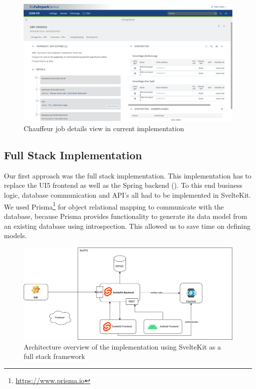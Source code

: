 \begin{figure}
    \centering
    \includegraphics[width=\linewidth]{assets/current-auftrag-details}
    \caption{Chauffeur job details view in current implementation}
    \label{fig:current-details-auftrag}
\end{figure}


\subsection{Full Stack Implementation}
Our first approach was the full stack implementation. This implementation has to replace the UI5 frontend as well as the Spring backend (). To this end business logic, database communication and API's all had to be implemented in SvelteKit. We used Prisma\footnote{\url{https://www.prisma.io}} for object relational mapping to communicate with the database, because Prisma provides functionality to generate its data model from an existing database using introspection. This allowed us to save time on defining models. 



\begin{figure}
    \centering
    \includegraphics[width=.8\linewidth]{assets/dswfd-architecture-fullstack}
    \caption{Architecture overview of the implementation using SvelteKit as a full stack framework}
    \label{fig:dswfd-architecture-fullstack}
\end{figure}

